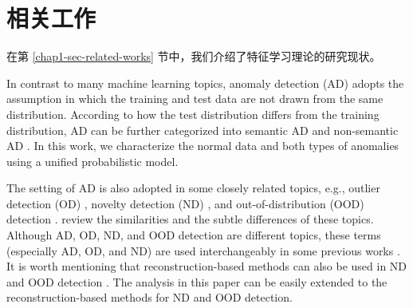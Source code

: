\chapter{相关工作}\label{app:auxiliary related works}

在第 \ref{chap1-sec-related-works} 节中，我们介绍了特征学习理论的研究现状。

In contrast to many machine learning topics, anomaly detection (AD) adopts the  assumption in which the training and test data are not drawn from the same distribution. 
According to how the test distribution differs from the training distribution, AD can be further categorized into semantic AD \citep{DBLP:conf/aaai/AhmedC20,DBLP:conf/icml/DeeckeRVB21} and non-semantic AD \citep{DBLP:journals/ijcv/BergmannBFSS21,DBLP:journals/corr/abs-2305-15956}.
In this work, we characterize the normal data and both types of anomalies using a unified probabilistic model.

The  setting of AD is also adopted in some closely related topics, e.g., outlier detection (OD) \citep{DBLP:journals/access/WangBH19}, novelty detection (ND) \citep{DBLP:journals/sigpro/PimentelCCT14}, and out-of-distribution (OOD) detection \citep{DBLP:conf/cvpr/GrahamPTNOC23}.
\citet{DBLP:journals/corr/abs-2110-11334} review the similarities and the subtle differences of these topics.
Although AD, OD, ND, and OOD detection are different topics, these terms (especially AD, OD, and ND) are used interchangeably in some previous works \citep{DBLP:journals/pieee/RuffKVMSKDM21,DBLP:journals/csur/PangSCH21}.
It is worth mentioning that reconstruction-based methods can also be used in ND \citep{DBLP:conf/nips/PidhorskyiAD18,DBLP:conf/cvpr/PereraNX19} and OOD detection \citep{DBLP:conf/cvpr/Zhou22}.
The analysis in this paper can be easily extended to the reconstruction-based methods for ND and OOD detection.

